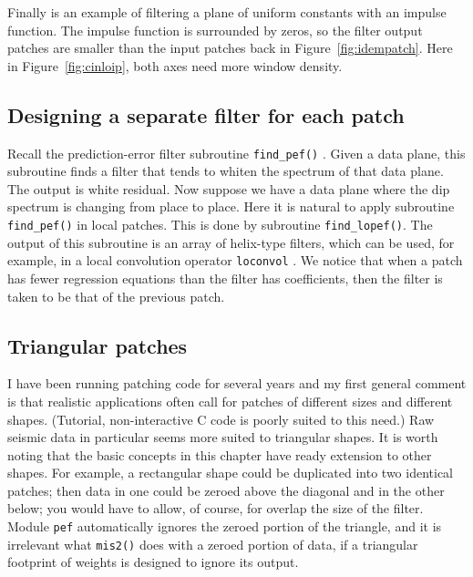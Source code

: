 \par
Finally is an example
of filtering a plane of uniform constants with an impulse function.
The impulse function is surrounded by zeros,
so the filter output patches are smaller than 
the input patches back in Figure~\ref{fig:idempatch}.
Here in Figure~\ref{fig:cinloip},
both axes need more window density.


\subsection{Designing a separate filter for each patch}
Recall the prediction-error filter subroutine 
\texttt{find\_pef()} .
Given a data plane, this subroutine finds a filter that tends
to whiten the spectrum of that data plane.
The output is white residual.
Now suppose we have a data plane where the dip spectrum
is changing from place to place.
Here it is natural to apply subroutine {\tt find\_pef()} in local patches.
This is done by subroutine \texttt{find\_lopef()}. 
The output of this subroutine is an array of helix-type filters,
which can be used, for example,
in a local convolution operator
\texttt{loconvol} .
We notice that when a patch has fewer regression equations
than the filter has coefficients, then the filter is taken
to be that of the previous patch.


\par

\subsection{Triangular patches}
I have been running patching code for several years
and my first general comment is that realistic applications
often call for patches of different sizes and different shapes.
(Tutorial, non-interactive C code is poorly suited to this need.)
Raw seismic data in particular seems more suited to triangular shapes.
It is worth noting that the basic concepts in this chapter
have ready extension to other shapes.
For example,
a rectangular shape could be duplicated into two identical patches;
then data in one could be zeroed above the diagonal
and in the other below;
you would have to allow, of course, for overlap the size of the filter.
Module \texttt{pef}  automatically ignores the zeroed portion
of the triangle,
and it is irrelevant what \texttt{mis2()} 
does with a zeroed portion of data,
if a triangular footprint of weights is designed to ignore its output.

